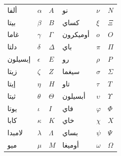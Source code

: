 \documentclass[../../../include/open-logic-chapter]{subfiles}
\begin{document}

\begin{center}
    \begin{tabular}{lll@{\qquad}lll}
    ألفا &	$\alpha$ & $A$ &
    نو & $\nu$ & $N$ \\
    بيتا & $\beta$ & $B$ &
    كساي & $\xi$ & $\Xi$ \\
    غاما &	$\gamma$ & $\Gamma$ &
    أوميكرون & $o$ & $O$ \\
    دلتا & $\delta$ & $\Delta$ &
    باي & $\pi$ & $\Pi$ \\
    إبسيلون & $\epsilon$ & $E$ &
    رو & $\rho$ & $P$ \\
    زيتا & $\zeta$ & $Z$ &
    سيغما &	$\sigma$ & $\Sigma$ \\
    إيتا & $\eta$ & $H$ &
    تاو & $\tau$ & $T$ \\
    ثيتا & $\theta$ & $\Theta$ &
    أبسيلون & $\upsilon$ & $\Upsilon$ \\
    يوتا & $\iota$ & $I$ &
    فاي & $\varphi$ & $\Phi$ \\
    كابا & $\kappa$ & $K$ &
    خاي & $\chi$ & $X$ \\
    لامبدا & $\lambda$ & $\Lambda$ &
    بساي & $\psi$ & $\Psi$ \\
    ميو & $\mu$ & $M$ &
    أوميغا & $\omega$ & $\Omega$
    \end{tabular}
\end{center}
\end{document}

